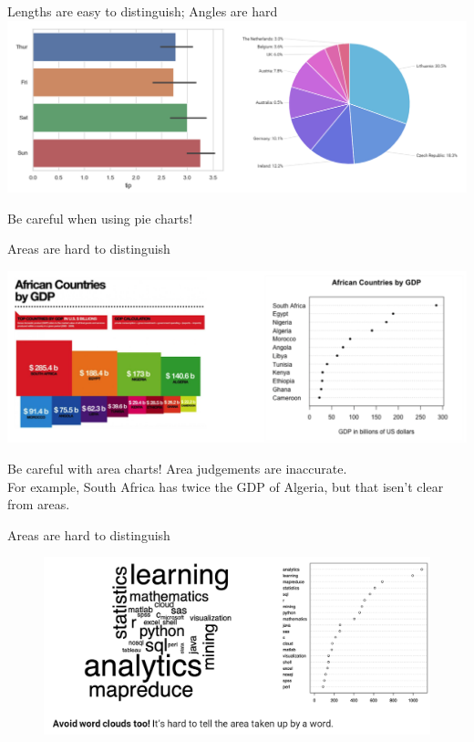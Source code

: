 \documentclass[aspectratio=169]{../latex_main/tntbeamer}  %
\begin{document}
	
	\begin{frame}{Lengths are easy to distinguish; Angles are hard}
	        \centering
	        \includegraphics[scale=.4]{Bild75}
	        
	        Be careful when using pie charts! 

	\end{frame}
	
	
	\begin{frame}{Areas are hard to distinguish}
	
	        \centering
	        \includegraphics[scale=.4]{Bild76}
	        
	        Be careful with area charts! Area judgements are inaccurate.\\
	        For example, South Africa has twice the GDP of Algeria, but that isen't clear from areas.
	        
	\end{frame}
	
	
	\begin{frame}{Areas are hard to distinguish}
	    \begin{figure}
	        \centering
	        \includegraphics[scale=.4]{Bild77}
	    \end{figure}
	\end{frame}
	
\end{document}
